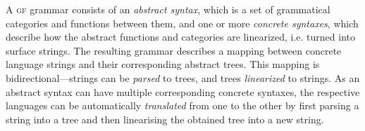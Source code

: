 \documentclass[11pt]{article}
\def\gf{\textsc{gf}}
\newcommand{\todo}[1]{{\color{cyan}\textbf{[TODO: }#1\textbf{]}}}
\begin{document}
A \gf{} grammar consists of an \emph{abstract syntax}, which is a set
of grammatical categories and functions between them, and one or more
\emph{concrete syntaxes}, which describe how the abstract functions
and categories are linearized, i.e. turned into surface strings. The
resulting grammar describes a mapping between concrete language
strings and their corresponding abstract trees. This mapping is
bidirectional---strings can be \emph{parsed} to trees, and trees
\emph{linearized} to strings. As an abstract syntax can have multiple
corresponding concrete syntaxes, the respective languages can be
automatically \emph{translated} from one to the other by first parsing
a string into a tree and then linearising the obtained tree into a new
string. 






\end{document}
